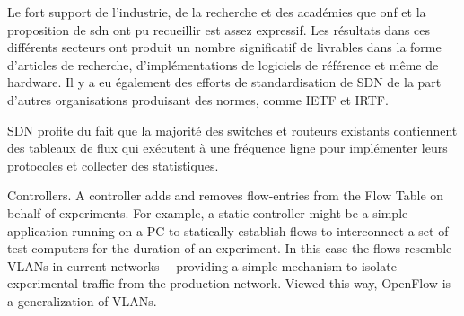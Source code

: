 Le fort support de l'industrie, de la recherche et des académies que \gls{onf} et la proposition de \gls{sdn} ont pu recueillir est assez expressif. Les résultats dans ces différents secteurs ont produit un nombre significatif de livrables dans la forme d'articles de recherche, d'implémentations de logiciels de référence et même de hardware. Il y a eu également des efforts de standardisation de SDN de la part d'autres organisations produisant des normes, comme IETF et IRTF. \cite{SurveySDNIntro}




SDN profite du fait que la majorité des switches et routeurs existants contiennent des tableaux de flux qui exécutent à une fréquence ligne pour implémenter leurs protocoles et collecter des statistiques.



Controllers. A controller adds and removes flow-entries from the Flow Table on behalf of experiments. For example, a static controller might be a simple application running on a PC to statically establish flows to interconnect a set of test computers for the duration of an experiment. In this case the flows resemble VLANs in current networks— providing a simple mechanism to isolate experimental traffic from the production network. Viewed this way, OpenFlow is a generalization of VLANs.

